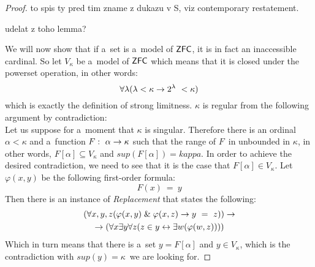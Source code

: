 \begin{proof}
to spis ty pred tim zname z dukazu v S, viz contemporary restatement.

udelat z toho lemma?
\ece
\

We will now show that if a~set is a~model of $\sf{ZFC}$, it is in fact an inaccessible cardinal. So let $V_\kappa$ be a~model of $\sf{ZFC}$ which means that it is closed under the powerset operation, in other words:
\begin{equation}
\forall \lambda (\lambda < \kappa \then 2^{\lambda} < \kappa)
\end{equation}
which is exactly the definition of strong limitness. $\kappa$ is regular from the following argument by contradiction:\\
Let us suppose for a~moment that $\kappa$ is singular. Therefore there is an ordinal $\alpha < \kappa$ and a~function $F:\ \alpha \rightarrow \kappa$ such that the range of $F$ in unbounded in $\kappa$, in other words, $F[\alpha] \subseteq V_\kappa$ and $sup(F[\alpha]) = kappa$. In order to achieve the desired contradiction, we need to see that it is the case that $F[\alpha] \in V_\kappa$. Let $\varphi(x, y)$ be the following first-order formula: %
\begin{equation}
F(x)\ =\ y
\end{equation}
Then there is an instance of \emph{Replacement} that states the following:
\begin{equation}
\begin{gathered}
(\forall x, y, z(\varphi(x, y) \mathrel{\&} \varphi(x, z) \rightarrow y\ =\ z)) \rightarrow \\
\rightarrow (\forall x \exists y \forall z (z \in y \leftrightarrow \exists w (\varphi(w, z))))
\end{gathered}
\end{equation}
Which in turn means that there is a~set $y = F[\alpha]$ and $y \in V_\kappa$, which is the contradiction with $sup(y) = \kappa$ we are looking for.
\end{proof}

\

